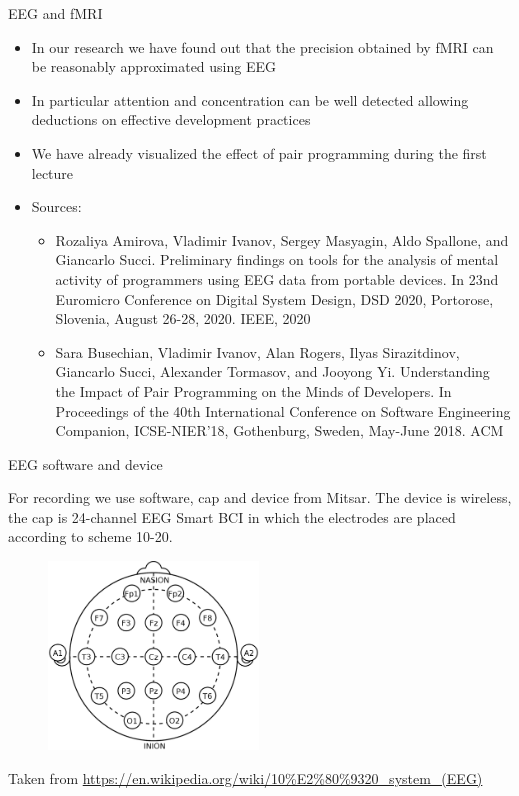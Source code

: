 \documentclass{beamer}
\begin{document}
\begin{frame}
{\centerline{EEG and fMRI}}

\begin{itemize}
    \item In our research we have found out that the precision obtained by fMRI can be reasonably approximated using EEG
    \item In particular attention and concentration can be well detected allowing deductions on effective development practices
    \item We have already visualized the effect of pair programming during the first lecture
\end{itemize}

    \begin{itemize}
    \tiny
    \item Sources:
        \begin{itemize}
        \tiny
        \item Rozaliya Amirova, Vladimir Ivanov, Sergey Masyagin, Aldo Spallone, and Giancarlo Succi. Preliminary findings on tools for the analysis of mental activity of programmers using EEG data from portable devices. In 23nd Euromicro Conference on Digital System Design, DSD 2020, Portorose, Slovenia, August 26-28, 2020. IEEE, 2020
        \item Sara Busechian, Vladimir Ivanov, Alan Rogers, Ilyas Sirazitdinov, Giancarlo Succi, Alexander Tormasov, and Jooyong Yi. Understanding the Impact of Pair Programming on the Minds of Developers. In Proceedings of the 40th International Conference on Software Engineering Companion, ICSE-NIER’18, Gothenburg, Sweden, May-June 2018. ACM
    \end{itemize}
        \end{itemize}

\end{frame}

\begin{frame}
{\centerline{EEG software and device}}
    For recording we use software, cap and device from Mitsar. The device is wireless, the cap is 24-channel EEG Smart BCI in which the electrodes are placed according to scheme 10-20.
    \begin{figure}
        \centering
        \includegraphics[height=5cm]{P2023.AIBCCSS.BrainSignals/10-20 scheme.png}
    \end{figure}
    \begin{center}
    \tiny{Taken from \url{https://en.wikipedia.org/wiki/10\%E2\%80\%9320_system_(EEG)}}
    \end{center}  
\end{frame}
\end{document}
